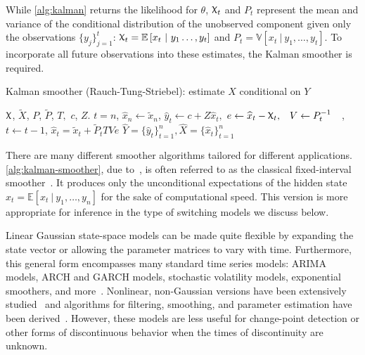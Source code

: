 \documentclass[12pt]{article}
\renewcommand{\hat}{\widehat}
\DeclareRobustCommand{\varx}{{\mathpalette\irchi\relax}}
\newcommand{\irchi}[2]{\protect\raisebox{\depth}{$#1\upchi$}}
\newcommand{\given}{\ \vert\ }
\newcommand{\E}{\mathbb{E}}
\newcommand{\Expect}[1]{\E\left[#1\right]}
\newcommand{\Var}[1]{\mathbb{V}\left[#1\right]}
\begin{document}

While \autoref{alg:kalman} returns the likelihood for $\theta$, 
$\varx_t$ and $P_t$ represent the mean and variance of the conditional distribution
of the unobserved component given only the observations
$\{y_j\}_{j=1}^t$: $\varx_t=\Expect{x_t\given y_1\ldots,y_t}$ and
$P_t=\Var{x_t\given y_1,\ldots,y_t}$. To
incorporate all future observations into these estimates, the Kalman
smoother is required.
\begin{algorithm}[t!]
  \begin{singlespace}
  \caption{Kalman smoother (Rauch-Tung-Striebel): estimate $\hat{X}$ conditional on
    $Y$\label{alg:kalman-smoother}} 
  \begin{algorithmic}
     $\varx$, $\widetilde{X}$, $P$, $\widetilde{P}$,
    $T,$ $c$, $Z$.
    \STATE $t=n$,
    \STATE $\hat{x}_{n}\leftarrow \widetilde{x}_n$, 
    \STATE $\hat{y}_{t} \leftarrow c + Z\hat{x}_t,$
    \STATE $\begin{aligned} e &\leftarrow \hat{x}_t -
      \varx_t, & V &\leftarrow P_t^{-1}\end{aligned}$,
    \STATE $t\leftarrow t-1$, 
    \STATE $\hat{x}_t = \widetilde{x}_t + \widetilde{P}_t T Ve $ 
    \ENDWHILE
    \RETURN $\widehat{Y}=\{\hat{y}_t\}_{t=1}^n, \hat{X}=\{\hat{x}_t\}_{t=1}^n$
  \end{algorithmic}
\end{singlespace}
\end{algorithm}
There are many different smoother algorithms tailored for different
applications. \autoref{alg:kalman-smoother}, due
to~\citet{RauchStriebel1965}, is often referred to as the classical
fixed-interval smoother~\citep{AndersonMoore1979}. It produces only
the unconditional expectations of the hidden state
$\hat{x}_t=\Expect{x_t\given y_1,\ldots,y_n}$ for the sake of
computational speed. This version is more appropriate for inference in
the type of switching models we discuss below.


Linear Gaussian state-space models can be made quite flexible
by expanding the state vector or allowing the parameter matrices to
vary with time. Furthermore, this general form encompasses many
standard time series models: ARIMA models, ARCH and GARCH models,
stochastic volatility models, exponential smoothers, and
more~\citep[see][for many other
examples]{DurbinKoopman2001}. Nonlinear, non-Gaussian versions have
been extensively
studied~\citep{DurbinKoopman1997,Fuh2006,Kitagawa1987,Kitagawa1996}
and algorithms for filtering, smoothing, and parameter estimation have
been derived~\citep[e.g.,][]{KoyamaPerez-Bolde2010,AndrieuDoucet2010}. 
However, these models are less useful
for change-point detection or other forms of discontinuous behavior
when the times of discontinuity are unknown. 
\end{document}
